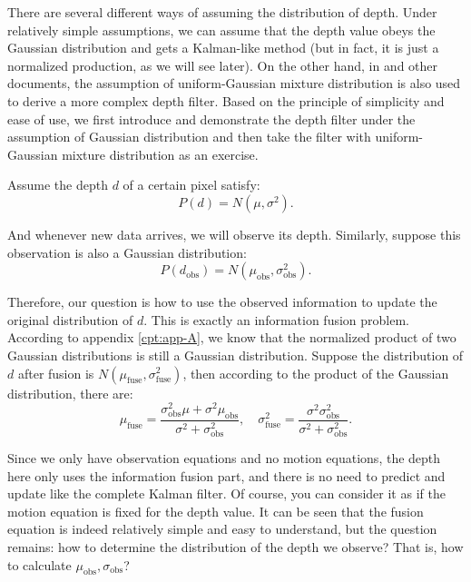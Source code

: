 There are several different ways of assuming the distribution of depth. Under relatively simple assumptions, we can assume that the depth value obeys the Gaussian distribution and gets a Kalman-like method (but in fact, it is just a normalized production, as we will see later). On the other hand, in \cite{Vogiatzis2011, Forster2014} and other documents, the assumption of uniform-Gaussian mixture distribution is also used to derive a more complex depth filter. Based on the principle of simplicity and ease of use, we first introduce and demonstrate the depth filter under the assumption of Gaussian distribution and then take the filter with uniform-Gaussian mixture distribution as an exercise.

Assume the depth $d$ of a certain pixel satisfy:
\begin{equation}
	P(d) = N(\mu, \sigma^2).
\end{equation}

And whenever new data arrives, we will observe its depth. Similarly, suppose this observation is also a Gaussian distribution:
\begin{equation}
	P(d_{\mathrm{obs}}) = N(\mu_{\mathrm{obs}}, \sigma_{\mathrm{obs}}^2 ).
\end{equation}

Therefore, our question is how to use the observed information to update the original distribution of $d$. This is exactly an information fusion problem. According to appendix \ref{cpt:app-A}, we know that the normalized product of two Gaussian distributions is still a Gaussian distribution. Suppose the distribution of $d$ after fusion is $N(\mu_{\mathrm{fuse}}, \sigma_{\mathrm{fuse}}^2)$, then according to the product of the Gaussian distribution, there are:
\begin{equation}
	{\mu _{\mathrm{fuse}}} = \frac{{\sigma _{\mathrm{obs}}^2\mu  + {\sigma ^2}{\mu _{\mathrm{obs}}}}}{{{\sigma ^2} + \sigma _{\mathrm{obs}}^2}},\quad \sigma _{\mathrm{fuse}}^2 = \frac{{{\sigma ^2}\sigma _{\mathrm{obs}}^2}}{{{\sigma ^2} + \sigma _{\mathrm{obs}}^2}}.
\end{equation}

Since we only have observation equations and no motion equations, the depth here only uses the information fusion part, and there is no need to predict and update like the complete Kalman filter. Of course, you can consider it as if the motion equation is fixed for the depth value. It can be seen that the fusion equation is indeed relatively simple and easy to understand, but the question remains: how to determine the distribution of the depth we observe? That is, how to calculate $\mu_{\mathrm{obs}}, \sigma_{\mathrm{obs}}$?

